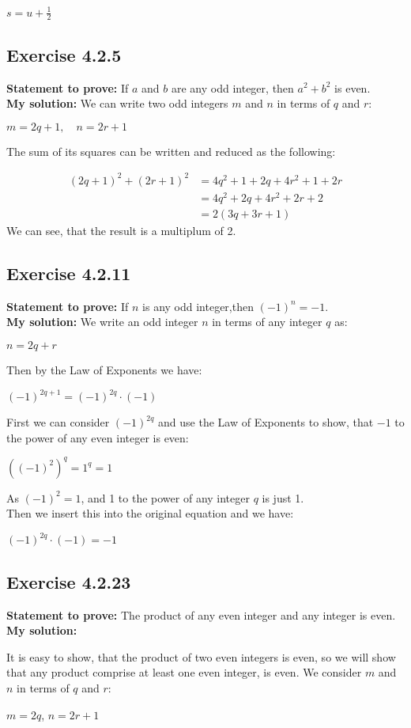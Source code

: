 \documentclass{report}
\newcommand{\cent}[1]{\begin{center}#1\end{center}}
\newcommand{\mAlign}[1]{\begin{align*}#1\end{align*}}
\newcommand{\Prove}{\textbf{Statement to prove: }}
\newcommand{\solution}{\textbf{My solution: }}
\newcommand{\QED}{\boxed{}}
\newcommand{\Exercise}[1]{\subsection{Exercise #1}}
\begin{document}
	\cent{$s=u+\frac{1}{2}$}
	
	\QED
	
	\Exercise{4.2.5}
	\Prove
	If $a$ and $b$ are any odd integer, then $a^2 + b^2$ is even.\\
	
	\solution
	We can write two odd integers $m$ and $n$ in terms of $q$ and $r$:
	\cent{$m = 2q+1, \quad n = 2r+1$}
	
	The sum of its squares can be written and reduced as the following:
	
	\mAlign{(2q+1)^2 + (2r+1)^2 &= 4q^2 + 1 + 2q + 4r^2 + 1 +2r \\
					&= 4q^2+2q + 4r^2 + 2r +2 \\
					&= 2(3q +3r +1)}
	We can see, that the result is a multiplum of 2.\\
	\QED
	
	\Exercise{4.2.11}
	
	\Prove
	If $n$ is any odd integer,then $(-1)^n = -1$.\\
	
	\solution
	We write an odd integer $n$ in terms of any integer $q$ as:
	
	\cent{$n = 2q+r$}
	
	Then by the Law of Exponents we have:
	
	\cent{$(-1)^{2q + 1} = (-1)^{2q} \cdot (-1)$}
	
	First we can consider $(-1)^{2q}$ and use the Law of Exponents to show, that $-1$ to the power of any even integer is even:
	
	\cent{$((-1)^2)^q = 1^q = 1$}
	
	As $(-1)^2 = 1$, and 1 to the power of any integer $q$ is just 1.\\
	
	Then we insert this into the original equation and we have:
	
	\cent{$(-1)^{2q} \cdot (-1) = -1$}
	
	\QED
	
	\Exercise{4.2.23}
	
	\Prove
	The product of any even integer and any integer is even.\\
	
	\solution
	
	It is easy to show, that the product of two even integers is even, so we will show that any product comprise at least one even integer, is even. We consider $m$ and $n$ in terms of $q$ and $r$:
	
	\cent{$m = 2q$, \quad $n = 2r+1$}
	
\end{document}
